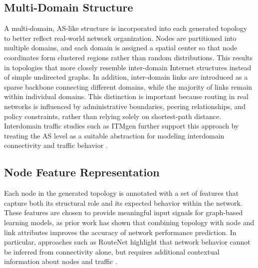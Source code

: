 \documentclass[12pt]{article}
\begin{document}
\subsection{Multi-Domain Structure}
A multi-domain, AS-like structure is incorporated into each generated topology to better reflect real-world network organization. Nodes are partitioned into multiple domains, and each domain is assigned a spatial center so that node coordinates form clustered regions rather than random distributions. This results in topologies that more closely resemble inter-domain Internet structures instead of simple undirected graphs. In addition, inter-domain links are introduced as a sparse backbone connecting different domains, while the majority of links remain within individual domains. This distinction is important because routing in real networks is influenced by administrative boundaries, peering relationships, and policy constraints, rather than relying solely on shortest-path distance. Interdomain traffic studies such as ITMgen further support this approach by treating the AS level as a suitable abstraction for modeling interdomain connectivity and traffic behavior \cite{itmgen}.

\subsection{Node Feature Representation}
Each node in the generated topology is annotated with a set of features that capture both its structural role and its expected behavior within the network. These features are chosen to provide meaningful input signals for graph-based learning models, as prior work has shown that combining topology with node and link attributes improves the accuracy of network performance prediction. In particular, approaches such as RouteNet highlight that network behavior cannot be inferred from connectivity alone, but requires additional contextual information about nodes and traffic \cite{routeNet}.
\end{document}
